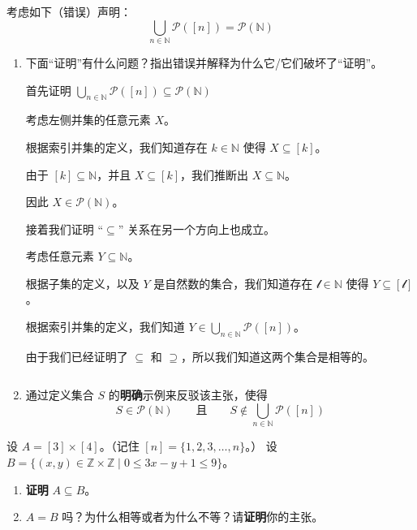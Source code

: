 \begin{exercise}
    考虑如下（错误）声明：
    \[\bigcup_{n \in \mathbb{N}}\mathcal{P}([n]) = \mathcal{P}(\mathbb{N})\]
    \begin{enumerate}[label=(\alph*)]
        \item 下面``证明''有什么问题？指出错误并解释为什么它/它们破坏了``证明''。
            \begin{spoof}
                首先证明 $\displaystyle{\bigcup_{n \in \mathbb{N}}\mathcal{P}([n]) \subseteq \mathcal{P}(\mathbb{N})}$

                考虑左侧并集的任意元素 $X$。

                根据索引并集的定义，我们知道存在 $k \in \mathbb{N}$ 使得 $X \subseteq [k]$。

                由于 $[k] \subseteq \mathbb{N}$，并且 $X \subseteq [k]$，我们推断出 $X \subseteq \mathbb{N}$。

                因此 $X \in \mathcal{P}(\mathbb{N})$。

                接着我们证明 ``$\subseteq$'' 关系在另一个方向上也成立。

                考虑任意元素 $Y \subseteq \mathbb{N}$。

                根据子集的定义，以及 $Y$ 是自然数的集合，我们知道存在 $\mathscr{l} \in \mathbb{N}$ 使得 $Y \subseteq [\mathscr{l}]$。

                根据索引并集的定义，我们知道 $\displaystyle{Y \in \bigcup_{n \in \mathbb{N}}\mathcal{P}([n])}$。

                由于我们已经证明了 $\subseteq$ 和 $\supseteq$，所以我们知道这两个集合是相等的。
            \end{spoof}
            $\quad$
        \item 通过定义集合 $S$ 的\textbf{明确}示例来反驳该主张，使得
            \[S \in \mathcal{P}(\mathbb{N}) \qquad \text{且} \qquad S \notin \bigcup_{n \in \mathbb{N}}\mathcal{P}([n])\]
    \end{enumerate}
\end{exercise}

\begin{exercise}
    设 $A = [3] \times [4]$。（记住 $[n] = \{1, 2, 3, \dots , n\}$。）
    设 $B = \{(x, y) \in \mathbb{Z} \times \mathbb{Z} \mid 0 \le 3x - y + 1 \le 9\}$。
    \begin{enumerate}[label=(\alph*)]
        \item \textbf{证明} $A \subseteq B$。
        \item $A = B$ 吗？为什么相等或者为什么不等？请\textbf{证明}你的主张。
    \end{enumerate}
\end{exercise}

